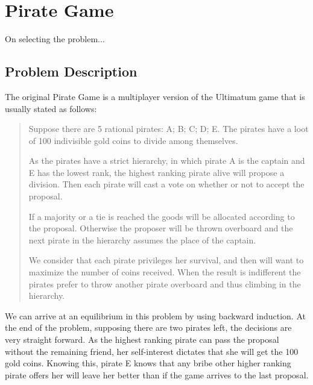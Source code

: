 


\section{Pirate Game}
\label{sec:pirate}

\begin{emph}
On selecting the problem...
\end{emph}


\subsection{Problem Description}
\label{subsec:description}

The original Pirate Game is a multiplayer version of the Ultimatum game that is usually stated as follows:

\begin{quotation}
Suppose there are 5 rational pirates: A; B; C; D; E. The pirates have a  loot of 100 indivisible gold coins to divide among themselves.


As the pirates have a strict hierarchy, in which pirate A is the captain and E has the lowest rank, the highest ranking pirate alive will propose a division. Then each pirate will cast a vote on whether or not to accept the proposal. 

If a majority or a tie is reached the goods will be allocated according to the proposal. Otherwise the proposer will be thrown overboard and the next pirate in the hierarchy assumes the place of the captain. 

We consider that each pirate privileges her survival, and then will want to maximize the number of coins received. When the result is indifferent the pirates prefer to throw another pirate overboard and thus climbing in the hierarchy. 
\end{quotation}

We can arrive at an equilibrium in this problem by using backward induction. At the end of the problem, supposing there are two pirates left, the decisions are very straight forward. As the highest ranking pirate can pass the proposal without the remaining friend, her self-interest dictates that she will get the 100 gold coins. Knowing this, pirate E knows that any bribe other higher ranking pirate offers her will leave her better than if the game arrives to the last proposal. 

